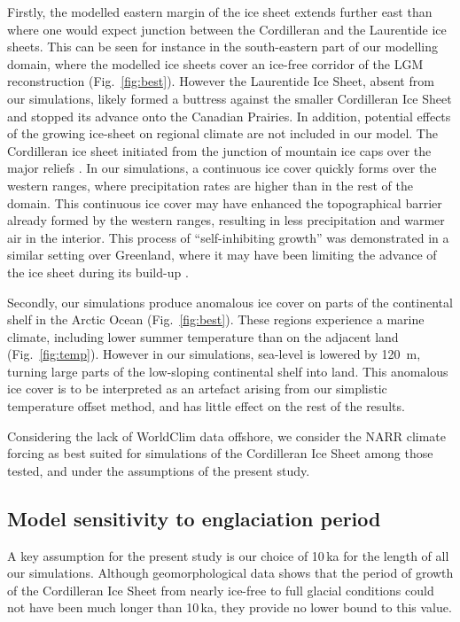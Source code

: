 Firstly, the modelled eastern margin of the ice sheet extends further east than where one would expect junction between the Cordilleran and the Laurentide ice sheets. This can be seen for instance in the south-eastern part of our modelling domain, where the modelled ice sheets cover an ice-free corridor of the LGM reconstruction (Fig.~\ref{fig:best}). However the Laurentide Ice Sheet, absent from our simulations, likely formed a buttress against the smaller Cordilleran Ice Sheet and stopped its advance onto the Canadian Prairies. In addition, potential effects of the growing ice-sheet on regional climate are not included in our model. The Cordilleran ice sheet initiated from the junction of mountain ice caps over the major reliefs \citep{clague-1989}. In our simulations, a continuous ice cover quickly forms over the western ranges, where precipitation rates are higher than in the rest of the domain. This continuous ice cover may have enhanced the topographical barrier already formed by the western ranges, resulting in less precipitation and warmer air in the interior. This process of ``self-inhibiting growth'' was demonstrated in a similar setting over Greenland, where it may have been limiting the advance of the ice sheet during its build-up \citep{langen-etal-2012}.

Secondly, our simulations produce anomalous ice cover on parts of the continental shelf in the Arctic Ocean (Fig.~\ref{fig:best}). These regions experience a marine climate, including lower summer temperature than on the adjacent land (Fig.~\ref{fig:temp}). However in our simulations, sea-level is lowered by 120~m, turning large parts of the low-sloping continental shelf into land. This anomalous ice cover is to be interpreted as an artefact arising from our simplistic temperature offset method, and has little effect on the rest of the results.

Considering the lack of WorldClim data offshore, we consider the NARR climate forcing as best suited for simulations of the Cordilleran Ice Sheet among those tested, and under the assumptions of the present study.

\subsection{Model sensitivity to englaciation period}

A key assumption for the present study is our choice of 10\,ka for the length of all our simulations. Although geomorphological data shows that the period of growth of the Cordilleran Ice Sheet from nearly ice-free to full glacial conditions could not have been much longer than 10\,ka, they provide no lower bound to this value.

